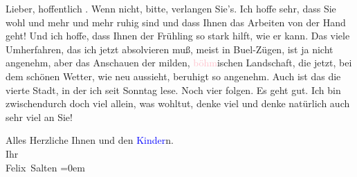 \pstart{}Lieber,\pend
\pstart
           hoffentlich \label{K_L03569-1v}\label{K_L03569-1h}. Wenn nicht,
               bitte, verlangen Sie’s. Ich hoffe sehr, dass Sie wohl und mehr und mehr ruhig sind
               und dass Ihnen das Arbeiten von der Hand geht! Und ich hoffe, dass Ihnen der Frühling
               so stark hilft, wie er kann. Das viele Umherfahren, das ich jetzt absolvieren muß,
               meist in Bu{\geminationm}el-Zügen, ist ja nicht angenehm, aber das
               Anschauen der milden, \textcolor{pink}{böhm}{}\ledrightnote{{$\rightarrow$}\textcolor{pink}{Böhmen}}ischen Landschaft, die jetzt, bei dem schönen Wetter, wie neu aussieht,
               beruhigt so angenehm. Auch ist das die vierte Stadt, in der ich seit Sonntag lese. Noch vier folgen. Es geht gut. Ich bin
               zwischendurch doch viel allein, was wohltut, denke viel und denke natürlich auch sehr
               viel an Sie!\pend
           
\pstart
           Alles Herzliche Ihnen und den \textcolor{blue}{Kinder}{}\ledrightnote{{$\rightarrow$}\textcolor{blue}{Heinrich Schnitzler}{\newline}{$\rightarrow$}\textcolor{blue}{Lili Cappellini}}n. {\\[\baselineskip]}Ihr {\\[\baselineskip]}\spacefill\mbox{Felix Salten}\pend
           \leftskip=0em{}\endnumbering{}  
      